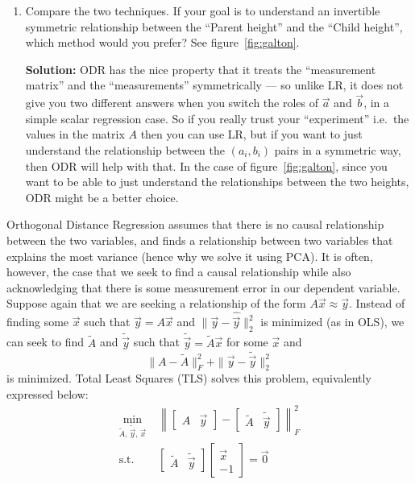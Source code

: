 \documentclass[10pt]{article}
\begin{document}
\begin{enumerate}[label=(\alph*), start=5]
\item Compare the two techniques. If your goal is to understand an invertible symmetric relationship between the ``Parent height'' and the ``Child height'', which method would you prefer? See figure~\ref{fig:galton}.

\textbf{Solution:} ODR has the nice property that it treats the ``measurement matrix'' and the ``measurements'' symmetrically --- so unlike LR, it does not give you two different answers when you switch the roles of $\vec{a}$ and $\vec{b}$, in a simple scalar regression case. So if you really trust your ``experiment'' i.e.\ the values in the matrix $A$ then you can use LR, but if you want to just understand the relationship between the $(a_i, b_i)$ pairs in a symmetric way, then ODR will help with that. In the case of figure~\ref{fig:galton}, since you want to be able to just understand the relationships between the two heights, ODR might be a better choice.
\end{enumerate}

\bigskip

Orthogonal Distance Regression assumes that there is no causal relationship between the two variables, and finds a relationship between two variables that explains the most variance (hence why we solve it using PCA). It is often, however, the case that we seek to find a causal relationship while also acknowledging that there is some measurement error in our dependent variable. Suppose again that we are seeking a relationship of the form $A\vec{x} \approx \vec{y}$. Instead of finding some $\vec{x}$ such that $\hat{\vec{y}} = A\vec{x}$ and $\|\vec{y} - \hat{\vec{y}}\|_2^2$ is minimized (as in OLS), we can seek to find $\tilde{A}$ and $\tilde{\vec{y}}$ such that $\tilde{\vec{y}} = \tilde{A}\vec{x}$ for some $\vec{x}$ and
\[
\|A - \tilde{A}\|_F^2 + \|\vec{y} - \tilde{\vec{y}}\|_2^2
\]
is minimized. Total Least Squares (TLS) solves this problem, equivalently expressed below:
\begin{align}
\min_{\tilde{A},\,\tilde{\vec{y}},\,\vec{x}} &\;\left\| \begin{bmatrix} A & \vec{y} \end{bmatrix} - \begin{bmatrix} \tilde{A} & \tilde{\vec{y}} \end{bmatrix} \right\|_F^2 \\
\text{s.t.} &\;\begin{bmatrix} \tilde{A} & \tilde{\vec{y}} \end{bmatrix} \begin{bmatrix} \vec{x} \\ -1 \end{bmatrix} = \vec{0}
\end{align}
\end{document}
